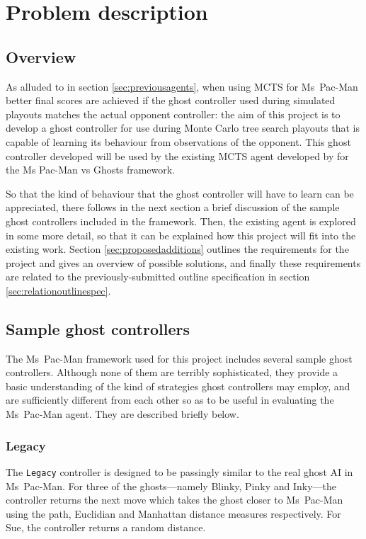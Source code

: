 \chapter{Problem description}
\label{ch:problem}

\section{Overview}

As alluded to in section \ref{sec:previousagents}, when using MCTS for Ms~Pac-Man better final scores are achieved if the ghost controller used during simulated playouts matches the actual opponent controller: the aim of this project is to develop a ghost controller for use during Monte Carlo tree search playouts that is capable of learning its behaviour from observations of the opponent.  This ghost controller developed will be used by the existing MCTS agent developed by \citet{Me2012} for the Ms Pac-Man vs Ghosts framework.

So that the kind of behaviour that the ghost controller will have to learn can be appreciated, there follows in the next section a brief discussion of the sample ghost controllers included in the framework.  Then, the existing agent is explored in some more detail, so that it can be explained how this project will fit into the existing work.  Section \ref{sec:proposedadditions} outlines the requirements for the project and gives an overview of possible solutions, and finally these requirements are related to the previously-submitted outline specification in section \ref{sec:relationoutlinespec}.


\section{Sample ghost controllers}
\label{sec:sampleghosts}

The Ms~Pac-Man framework used for this project includes several sample ghost controllers.  Although none of them are terribly sophisticated, they provide a basic understanding of the kind of strategies ghost controllers may employ, and are sufficiently different from each other so as to be useful in evaluating the Ms~Pac-Man agent.  They are described briefly below.

\subsection{Legacy}
\label{sec:legacy}
The {\tt Legacy} controller is designed to be passingly similar to the real ghost AI in Ms~Pac-Man.  For three of the ghosts---namely Blinky, Pinky and Inky---the controller returns the next move which takes the ghost closer to Ms~Pac-Man using the path, Euclidian and Manhattan distance measures respectively.  For Sue, the controller returns a random distance.


